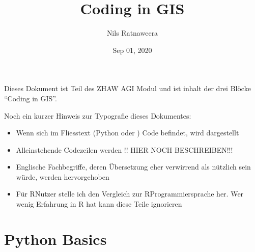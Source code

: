 \documentclass[letterpaper,10pt,english]{sphinxmanual}
\title{Coding in GIS}
\date{Sep 01, 2020}
\author{Nils Ratnaweera}
\begin{document}
\pagestyle{empty}
\sphinxmaketitle
\pagestyle{plain}
\sphinxtableofcontents
\pagestyle{normal}
\label{\detokenize{intro::doc}}


Dieses Dokument ist Teil des ZHAW AGI Modul und ist inhalt der drei Blöcke “Coding in GIS”.

Noch ein kurzer Hinweis zur Typografie dieses Dokumentes:
\begin{itemize}
\item {} 
Wenn sich im Fliesstext (Python oder ) Code befindet, wird  dargestellt

\item {} 
Alleinstehende Codezeilen werden  !! HIER NOCH BESCHREIBEN!!!

\item {} 
Englische Fachbegriffe, deren Übersetzung eher verwirrend als nützlich sein würde, werden  hervorgehoben

\item {} 
Für R\sphinxhyphen{}Nutzer stelle ich den Vergleich zur R\sphinxhyphen{}Programmiersprache her. Wer wenig Erfahrung in R hat kann diese Teile ignorieren

\end{itemize}


\chapter{Python Basics}
\label{\detokenize{01_02_Python_Basics:python-basics}}\label{\detokenize{01_02_Python_Basics::doc}}
\end{document}

